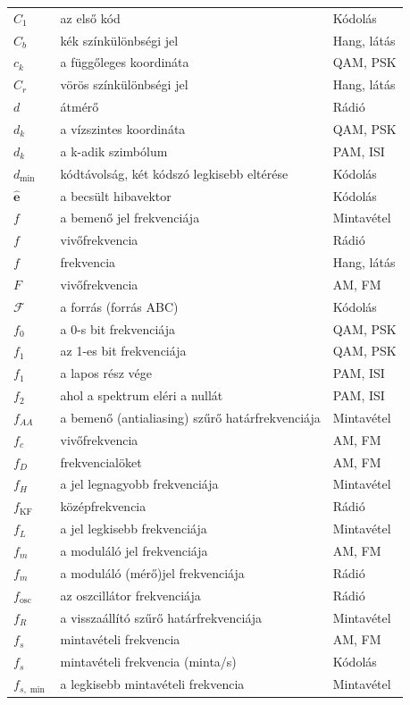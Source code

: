{\begin{longtable}{@{}>{\raggedright\arraybackslash}p{2.4cm}>{\raggedright\arraybackslash}p{8.2cm}>{\raggedright\arraybackslash}p{3.8cm}@{}}
$C_1$ & az első kód & Kódolás\\
$C_b$ & kék színkülönbségi jel & Hang, látás\\
$c_k$ & a függőleges koordináta & QAM, PSK\\
$C_r$ & vörös színkülönbségi jel & Hang, látás\\
$d$ & átmérő & Rádió\\
$d_k$ & a vízszintes koordináta & QAM, PSK\\
$d_k$ & a k-adik szimbólum & PAM, ISI\\
$d_{\min}$ & kódtávolság, két kódszó legkisebb eltérése & Kódolás\\
$\hat{\mathbf e}$ & a becsült hibavektor & Kódolás\\
$f$ & a bemenő jel frekvenciája & Mintavétel\\
$f$ & vivőfrekvencia & Rádió\\
$f$ & frekvencia & Hang, látás\\
$F$ & vivőfrekvencia & AM, FM\\
$\mathcal F$ & a forrás (forrás ABC) & Kódolás\\
$f_0$ & a 0-s bit frekvenciája & QAM, PSK\\
$f_1$ & az 1-es bit frekvenciája & QAM, PSK\\
$f_1$ & a lapos rész vége & PAM, ISI\\
$f_2$ & ahol a spektrum eléri a nullát & PAM, ISI\\
$f_{AA}$ & a bemenő (antialiasing) szűrő határfrekvenciája & Mintavétel\\
$f_c$ & vivőfrekvencia & AM, FM\\
$f_D$ & frekvencialöket & AM, FM\\
$f_H$ & a jel legnagyobb frekvenciája & Mintavétel\\
$f_\mathrm{KF}$ & középfrekvencia & Rádió\\
$f_L$ & a jel legkisebb frekvenciája & Mintavétel\\
$f_m$ & a moduláló jel frekvenciája & AM, FM\\
$f_m$ & a moduláló (mérő)jel frekvenciája & Rádió\\
$f_\text{osc}$ & az oszcillátor frekvenciája & Rádió\\
$f_R$ & a visszaállító szűrő határfrekvenciája & Mintavétel\\
$f_s$ & mintavételi frekvencia & AM, FM\\
$f_s$ & mintavételi frekvencia (minta/s) & Kódolás\\
$f_{s,\min}$ & a legkisebb mintavételi frekvencia & Mintavétel\\

\end{longtable}}
